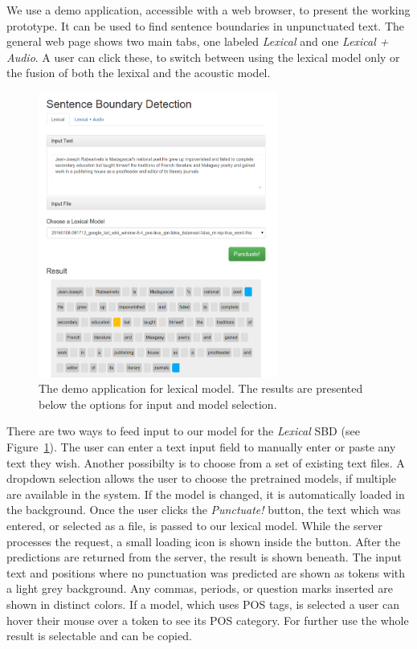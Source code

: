 We use a demo application, accessible with a web browser, to present the working prototype.
It can be used to find sentence boundaries in unpunctuated text.
The general web page shows two main tabs, one labeled \emph{Lexical} and one \emph{Lexical + Audio}.
A user can click these, to switch between using the lexical model only or the fusion of both the lexixal and the acoustic model.

\begin{figure}[ht]
    \centering
    \includegraphics[width=0.7\textwidth]{img/demo_l.png}
    \caption{The demo application for lexical model. The results are presented below the options for input and model selection.}
    \label{fig:demo_l}
\end{figure}

There are two ways to feed input to our model for the \emph{Lexical} SBD (see Figure~\ref{fig:demo_l}).
The user can enter a text input field to manually enter or paste any text they wish.
Another possibilty is to choose from a set of existing text files.
A dropdown selection allows the user to choose the pretrained models, if multiple are available in the system.
If the model is changed, it is automatically loaded in the background.
Once the user clicks the \emph{Punctuate!} button, the text which was entered, or selected as a file, is passed to our lexical model.
While the server processes the request, a small loading icon is shown inside the button.
After the predictions are returned from the server, the result is shown beneath.
The input text and positions where no punctuation was predicted are shown as tokens with a light grey background.
Any commas, periods, or question marks inserted are shown in distinct colors.
If a model, which uses POS tags, is selected a user can hover their mouse over a token to see its POS category.
For further use the whole result is selectable and can be copied.

